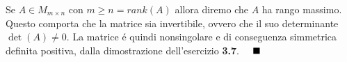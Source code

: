 Se $A \in M_{m \times n}$ con $m \geq n = rank(A)$ allora diremo che $A$ ha rango massimo.
\\
Questo comporta che la matrice sia invertibile, ovvero che il suo determinante $\det(A) \neq 0$. La matrice \'e quindi nonsingolare e di conseguenza simmetrica definita positiva, dalla dimostrazione dell'esercizio \textbf{3.7}. $\hspace{1em}\blacksquare$
